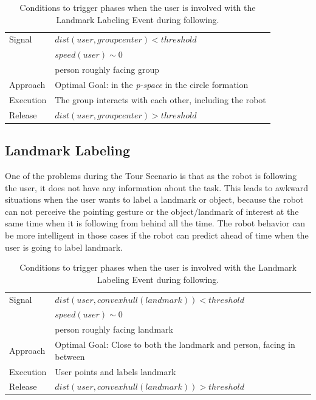 \begin{table}[ht!]
	\centering
  \begin{tabular}{l |  m{10cm}}    
    \toprule    
    Signal & {$dist(user, groupcenter)<threshold$}\\       
	                           & {$speed(user)\sim 0$} \\
	                           & {person roughly facing group}\\ \midrule		                           		                                
    Approach & {Optimal Goal: in the \textit{p-space} in the circle formation}\\       \midrule
    Execution & {The group interacts with each other, including the robot}\\  \midrule
    Release & {$dist(user, groupcenter)>threshold$}\\ 
    \bottomrule
  \end{tabular}
      \caption{Conditions to trigger phases when the user is involved with the Landmark Labeling Event during following.}
    \label{table:situation_aware_list_group}
\end{table}


\subsection{Landmark Labeling}
\label{sec:following_landmark_labeling}

One of the problems during the Tour Scenario is that as the robot is following the user, it does not have any information about the task. This leads to awkward situations when the user wants to label a landmark or object, because the robot can not perceive the pointing gesture or the object/landmark of interest at the same time when it is following from behind all the time. The robot behavior can be more intelligent in those cases if the robot can predict ahead of time when the user is going to label landmark.

\begin{table}[ht!]
	\centering
  \begin{tabular}{l |  m{10cm}}    
    \toprule    
    Signal & {$dist(user, convex hull(landmark))<threshold$}\\       
	                           & {$speed(user)\sim 0$} \\
	                           & {person roughly facing landmark}\\ \midrule		                           		                                
    Approach & {Optimal Goal: Close to both the landmark and person, facing in between}\\       \midrule
    Execution & {User points and labels landmark}\\  \midrule
    Release & {$dist(user, convex hull(landmark))>threshold$}\\ 
    \bottomrule
  \end{tabular}
      \caption{Conditions to trigger phases when the user is involved with the Landmark Labeling Event during following.}
    \label{table:situation_aware_list_landmark}
\end{table}


